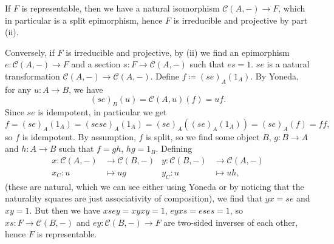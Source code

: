 If $F$ is representable, then we have a natural isomorphism
$\mathcal{C}(A, {-})\to F$, which in particular is a split epimorphism, hence
$F$ is irreducible and projective by part (ii).

Conversely, if $F$ is irreducible and projective, by (ii) we find an epimorphism
$e\colon \mathcal{C}(A, {-})\to F$ and a section $s\colon F\to \mathcal{C}(A, {-})$
such that $es = 1$. $se$ is a natural transformation $\mathcal{C}(A, {-})\to \mathcal{C}(A, {-})$.
Define $f\coloneqq (se)_A(1_A)$. By Yoneda, for any $u\colon A\to B$, we have
\[ (se)_B(u) = \mathcal{C}(A, u)(f) = uf. \]
Since $se$ is idempotent, in particular we get
\[ f = (se)_A(1_A) = (sese)_A(1_A) = (se)_A((se)_A(1_A)) = (se)_A(f) = ff, \]
so $f$ is idempotent. By assumption, $f$ is split, so we find some object $B$,
$g\colon B\to A$ and $h\colon A\to B$ such that $f = gh$, $hg = 1_B$. Defining
\begin{align*}
	x\colon \mathcal{C}(A, {-})&\to \mathcal{C}(B, {-}) & y\colon \mathcal{C}(B, {-})&\to \mathcal{C}(A, {-})\\
	x_C\colon u&\mapsto ug & y_C\colon u&\mapsto uh,
\end{align*}
(these are natural, which we can see either using Yoneda or by noticing that the
naturality squares are just associativity of composition), we find that $yx = se$ and $xy = 1$. But then we have
$xsey = xyxy = 1$, $eyxs = eses = 1$, so $xs \colon F\to \mathcal{C}(B, {-})$ and
$ey\colon \mathcal{C}(B, {-}) \to F$ are two-sided inverses of each other, hence
$F$ is representable.
